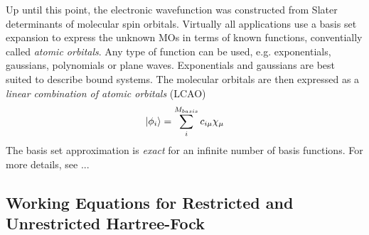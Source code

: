 Up until this point, the electronic wavefunction was constructed from Slater determinants of molecular spin orbitals. Virtually all applications use a basis set expansion to express the unknown MOs in terms of known functions, conventially called \emph{atomic orbitals}. Any type of function can be used, e.g. exponentials, gaussians, polynomials or plane waves. Exponentials and gaussians are best suited to describe bound systems. The molecular orbitals are then expressed as a \emph{linear combination of atomic orbitals} (LCAO)
\begin{equation}
\ket{\phi_i} = \sum_i^{M_{basis}} c_{i\mu} \chi_{\mu} 
\end{equation}
\noindent The basis set approximation is \emph{exact} for an infinite number of basis functions. For more details, see ...  

\subsection{Working Equations for Restricted and Unrestricted Hartree-Fock}

